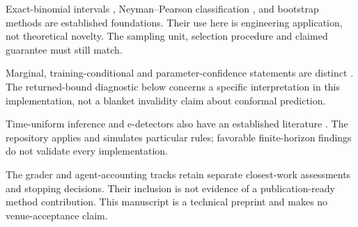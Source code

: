 Exact-binomial intervals \citep{clopper1934}, Neyman--Pearson classification
\citep{tong2018}, and bootstrap methods \citep{efron1979} are established
foundations. Their use here is engineering application, not theoretical novelty.
The sampling unit, selection procedure and claimed guarantee must still match.

Marginal, training-conditional and parameter-confidence statements are distinct
\citep{bian2022,coppola2025}. The returned-bound diagnostic below concerns a
specific interpretation in this implementation, not a blanket invalidity claim
about conformal prediction.

Time-uniform inference and e-detectors also have an established literature
\citep{howard2021,shin2022}. The repository applies and simulates particular
rules; favorable finite-horizon findings do not validate every implementation.

The grader and agent-accounting tracks retain separate closest-work
assessments and stopping decisions. Their inclusion is not evidence of a
publication-ready method contribution. This manuscript is a technical preprint
and makes no venue-acceptance claim.
